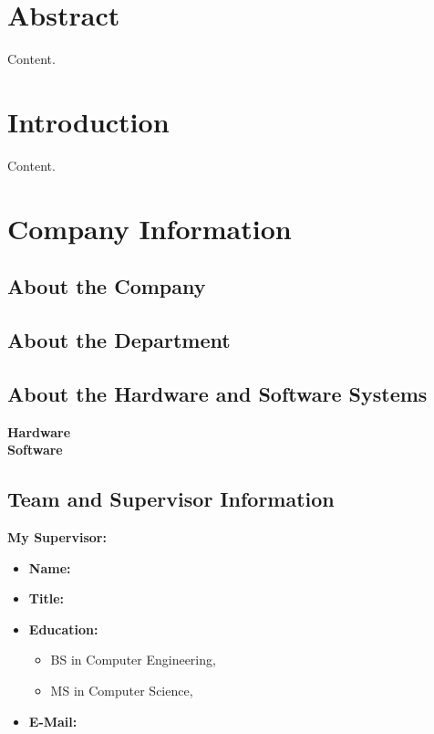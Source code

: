 \documentclass[10pt]{article}
\begin{document}
\section{Abstract}

Content.

\newpage

\section{Introduction}

Content.

\section{Company Information}

\subsection{About the Company}

\subsection{About the Department}

\subsection{About the Hardware and Software Systems}

\textbf{Hardware} \\

\textbf{Software} \\

\subsection{Team and Supervisor Information}


\textbf{My Supervisor:}
\begin{itemize}
    \item{\textbf{Name: } }
    \item{\textbf{Title: } }
    \item{\textbf{Education:} }
    \begin{itemize}
        \item{BS in Computer Engineering, }
        \item{MS in Computer Science, }
    \end{itemize}
    \item{\textbf{E-Mail: } }
\end{itemize}
\end{document}
